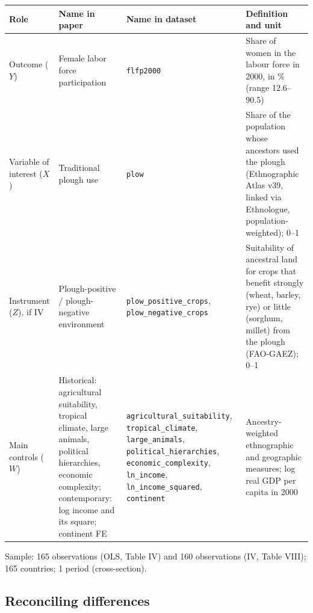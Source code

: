 \documentclass[11pt,a4paper]{article}
\renewcommand{\arraystretch}{1.25}
\begin{document}
{\renewcommand{\arraystretch}{1.4}%
\begin{tabularx}{\textwidth}{@{}>{\raggedright\arraybackslash}p{}
  >{\raggedright\arraybackslash}p{}
>{\raggedright\arraybackslash}p{}
  L@{}}
\toprule
Role & Name in paper & Name in dataset & Definition and unit \\
\midrule
Outcome ($Y$) & Female labor force participation & \texttt{flfp2000} & Share of women in the labour force in 2000, in \% (range 12.6--90.5) \\
Variable of interest ($X$) & Traditional plough use & \texttt{plow} & Share of the population whose ancestors used the plough (Ethnographic Atlas v39, linked via Ethnologue, population-weighted); 0--1 \\
Instrument ($Z$), if IV & Plough-positive / plough-negative environment & \texttt{plow\_\allowbreak positive\_\allowbreak crops}, \texttt{plow\_\allowbreak negative\_\allowbreak crops} & Suitability of ancestral land for crops that benefit strongly (wheat, barley, rye) or little (sorghum, millet) from the plough (FAO-GAEZ); 0--1 \\
Main controls ($W$) & Historical: agricultural suitability, tropical climate, large animals, political hierarchies, economic complexity; contemporary: log income and its square; continent FE & \texttt{agricultural\_\allowbreak suitability}, \texttt{tropical\_\allowbreak climate}, \texttt{large\_\allowbreak animals}, \texttt{political\_\allowbreak hierarchies}, \texttt{economic\_\allowbreak complexity}, \texttt{ln\_\allowbreak income}, \texttt{ln\_\allowbreak income\_\allowbreak squared}, \texttt{continent} & Ancestry-weighted ethnographic and geographic measures; log real GDP per capita in 2000 \\
\bottomrule
\end{tabularx}}

\medskip\noindent
Sample: 165 observations (OLS, Table IV) and 160 observations (IV, Table VIII); 165 countries; 1 period (cross-section).

\subsection{Reconciling differences}
\end{document}
